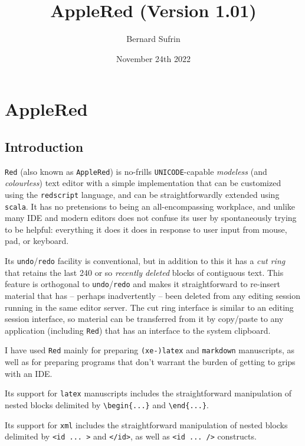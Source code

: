 \documentclass[12pt,a4paper]{article}
\title{AppleRed (Version 1.01)}
\author{Bernard Sufrin}
\date{November 24th 2022}
\begin{document}
\maketitle

\hypertarget{applered}{\section{AppleRed}\label{applered}}


\hypertarget{introduction}{\subsection{Introduction}\label{introduction}}

\texttt{Red} (also known as \texttt{AppleRed}) is no-frills
\texttt{UNICODE}-capable \emph{modeless} (and \emph{colourless}) text
editor with a simple implementation that can be customized using the
\texttt{redscript} language, and can be straightforwardly extended using
\texttt{scala}. It has no pretensions to being an all-encompassing
workplace, and unlike many IDE and modern editors does not confuse its
user by spontaneously trying to be helpful: everything it does it does
in response to user input from mouse, pad, or keyboard.

Its \texttt{undo}/\texttt{redo} facility is conventional, but in
addition to this it has a \emph{cut ring} that retains the last 240 or
so \emph{recently deleted} blocks of contiguous text. This feature is
orthogonal to \texttt{undo}/\texttt{redo} and makes it straightforward
to re-insert material that has -- perhaps inadvertently -- been deleted
from any editing session running in the same editor server. The cut ring
interface is similar to an editing session interface, so material can be
transferred from it by copy/paste to any application (including
\texttt{Red}) that has an interface to the system clipboard.


I have used \texttt{Red} mainly for preparing \texttt{(xe-)latex} and
\texttt{markdown} manuscripts, as well as for preparing programs that
don't warrant the burden of getting to grips with an IDE.

Its support for \texttt{latex} manuscripts includes the straightforward
manipulation of nested blocks delimited by
\texttt{\textbackslash{}begin\{...\}} and
\texttt{\textbackslash{}end\{...\}}.

Its support for \texttt{xml} includes the straightforward manipulation
of nested blocks delimited by
\texttt{\textless{}id\ ...\ \textgreater{}} and
\texttt{\textless{}/id\textgreater{}}, as well as
\texttt{\textless{}id\ ...\ /\textgreater{}} constructs.
\end{document}
